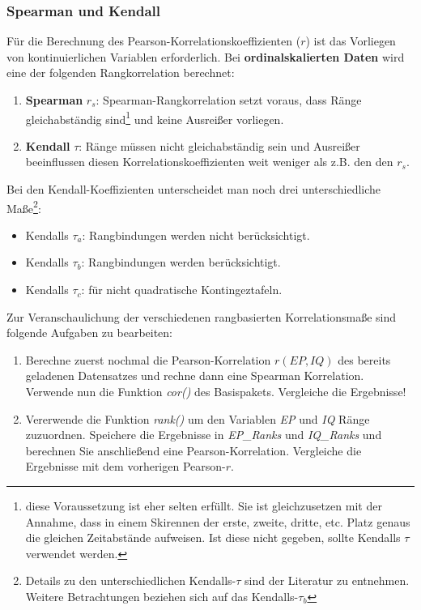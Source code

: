 \documentclass[
]{article}
\providecommand{\tightlist}{%
  \setlength{\itemsep}{0pt}\setlength{\parskip}{0pt}}
\begin{document}
\subsubsection*{Spearman und Kendall}\label{spearman-und-kendall}

Für die Berechnung des Pearson-Korrelationskoeffizienten (\(r\)) ist das Vorliegen von kontinuierlichen Variablen erforderlich. Bei \textbf{ordinalskalierten Daten} wird eine der folgenden Rangkorrelation berechnet:

\begin{enumerate}
\def\labelenumi{\arabic{enumi}.}
\tightlist
\item
  \textbf{Spearman} \(r_s\): Spearman-Rangkorrelation setzt voraus, dass Ränge gleichabständig sind\footnote{diese Voraussetzung ist eher selten erfüllt. Sie ist gleichzusetzen mit der Annahme, dass in einem Skirennen der erste, zweite, dritte, etc. Platz genaus die gleichen Zeitabstände aufweisen. Ist diese nicht gegeben, sollte Kendalls \(\tau\) verwendet werden.} und keine Ausreißer vorliegen.
\item
  \textbf{Kendall} \(\tau\): Ränge müssen nicht gleichabständig sein und Ausreißer beeinflussen diesen Korrelationskoeffizienten weit weniger als z.B. den den \(r_s\).
\end{enumerate}

Bei den Kendall-Koeffizienten unterscheidet man noch drei unterschiedliche Maße\footnote{Details zu den unterschiedlichen Kendalls-\(\tau\) sind der Literatur zu entnehmen. Weitere Betrachtungen beziehen sich auf das Kendalls-\(\tau_b\)}:

\begin{itemize}
\tightlist
\item
  Kendalls \(\tau_a\): Rangbindungen werden nicht berücksichtigt.
\item
  Kendalls \(\tau_b\): Rangbindungen werden berücksichtigt.
\item
  Kendalls \(\tau_c\): für nicht quadratische Kontingeztafeln.
\end{itemize}

Zur Veranschaulichung der verschiedenen rangbasierten Korrelationsmaße sind folgende Aufgaben zu bearbeiten:

\begin{enumerate}
\def\labelenumi{\arabic{enumi}.}
\tightlist
\item
  Berechne zuerst nochmal die Pearson-Korrelation \(r(EP,IQ)\) des bereits geladenen Datensatzes
  und rechne dann eine Spearman Korrelation. Verwende nun die Funktion \emph{cor()} des Basispakets. Vergleiche die Ergebnisse!
\item
  Vererwende die Funktion \emph{rank()} um den Variablen \emph{EP} und \emph{IQ} Ränge zuzuordnen. Speichere die Ergebnisse in \emph{EP\_Ranks} und \emph{IQ\_Ranks} und berechnen Sie anschließend eine Pearson-Korrelation. Vergleiche die Ergebnisse mit dem vorherigen Pearson-\(r\).
\end{enumerate}
\end{document}
